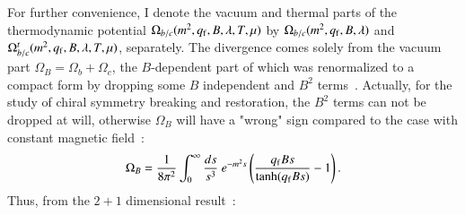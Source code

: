 \documentclass[aps,prd,amsmath,two column,amssymb,showpacs]{revtex4}
\begin{document}
For further convenience, I denote the vacuum and thermal parts of the thermodynamic potential $\Omega_{b/c}(m^2,q_{\rm f},B,\lambda,T,\mu)$ by $\Omega_{b/c}(m^2,q_{\rm f},B,\lambda)$ and $\Omega_{b/c}^t(m^2,q_{\rm f},B,\lambda,T,\mu)$, separately. The divergence comes solely from the vacuum part $\Omega_B=\Omega_{b}+\Omega_{c}$, the $B$-dependent part of which was renormalized to a compact form by dropping some $B$ independent and $B^2$ terms~\cite{Dunne:1997kw}.  Actually, for the study of chiral symmetry breaking and restoration, the $B^2$ terms can not be dropped at will, otherwise $\Omega_B$ will have a "wrong" sign compared to the case with constant magnetic field~\cite{Cao:2015xja}:
\begin{eqnarray}
\Omega_B={1\over8\pi^2}\int_0^\infty {ds\over s^3}~e^{-m^2s}\left({q_{\rm f}Bs\over\tanh(q_{\rm f}Bs)}-1\right).
\end{eqnarray}
Thus, from the $2+1$ dimensional result~\cite{Cangemi:1995ee}:
\end{document}
